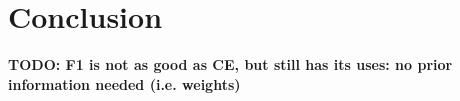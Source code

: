 \chapter {Conclusion}
\label{chap:conclusion}

\textbf{TODO: F1 is not as good as CE, but still has its uses: no prior information needed (i.e. weights)}